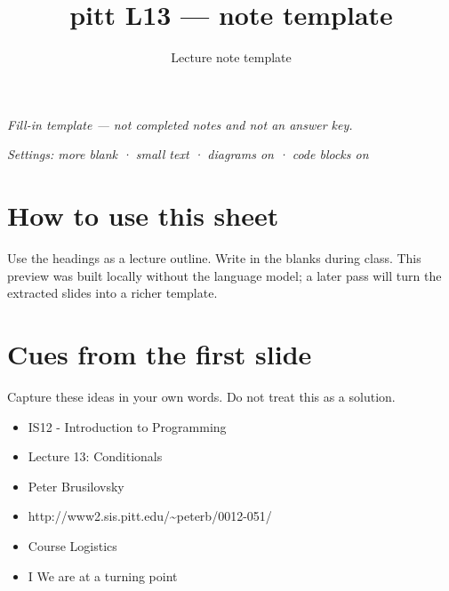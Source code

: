 \documentclass[11pt]{article}
\title{pitt L13 — note template}
\author{Lecture note template}
\date{}
\begin{document}
\maketitle
\begin{center}
\textit{Fill-in template --- not completed notes and not an answer key.}
\end{center}
\noindent\textit{Settings: more blank · small text · diagrams on · code blocks on}
\vspace{1em}
\section*{How to use this sheet}
Use the headings as a lecture outline. Write in the blanks during class.
This preview was built locally without the language model; a later pass will
turn the extracted slides into a richer template.
\section*{Cues from the first slide}
Capture these ideas in your own words. Do not treat this as a solution.
\begin{itemize}[leftmargin=*]
  \item IS12 - Introduction to Programming \hrulefill
  \vspace{2.4em}
  \item Lecture 13: Conditionals \hrulefill
  \vspace{2.4em}
  \item Peter Brusilovsky \hrulefill
  \vspace{2.4em}
  \item http://www2.sis.pitt.edu/\textasciitilde{}peterb/0012-051/ \hrulefill
  \vspace{2.4em}
  \item Course Logistics \hrulefill
  \vspace{2.4em}
  \item I We are at a turning point \hrulefill
  \vspace{2.4em}
\end{itemize}
\end{document}
